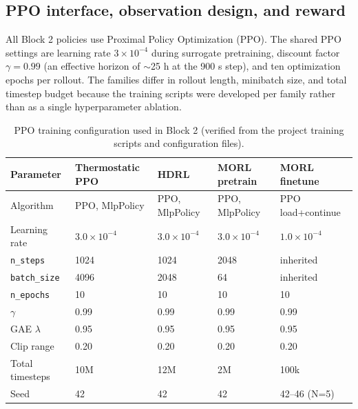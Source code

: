 \documentclass[11pt,a4paper]{article}
\begin{document}
\subsection{PPO interface, observation design, and reward}

All Block 2 policies use Proximal Policy Optimization (PPO). The shared PPO settings are learning rate $3\times 10^{-4}$ during surrogate pretraining, discount factor $\gamma=0.99$ (an effective horizon of $\sim$25 h at the 900 s step), and ten optimization epochs per rollout. The families differ in rollout length, minibatch size, and total timestep budget because the training scripts were developed per family rather than as a single hyperparameter ablation.

\begin{table}[H]
\centering
\caption{PPO training configuration used in Block 2 (verified from the project training scripts and configuration files).}
\label{tab:ppo_hparams}
\small
\begin{tabular}{lllll}
\toprule
Parameter & Thermostatic PPO & HDRL & MORL pretrain & MORL finetune \\
\midrule
Algorithm & PPO, MlpPolicy & PPO, MlpPolicy & PPO, MlpPolicy & PPO load+continue \\
Learning rate & $3.0{\times}10^{-4}$ & $3.0{\times}10^{-4}$ & $3.0{\times}10^{-4}$ & $1.0{\times}10^{-4}$ \\
\texttt{n\_steps} & 1024 & 1024 & 2048 & inherited \\
\texttt{batch\_size} & 4096 & 2048 & 64 & inherited \\
\texttt{n\_epochs} & 10 & 10 & 10 & 10 \\
$\gamma$ & 0.99 & 0.99 & 0.99 & 0.99 \\
GAE $\lambda$ & 0.95 & 0.95 & 0.95 & 0.95 \\
Clip range & 0.20 & 0.20 & 0.20 & 0.20 \\
Total timesteps & 10M & 12M & 2M & 100k \\
Seed & 42 & 42 & 42 & 42--46 (N=5) \\
\bottomrule
\end{tabular}
\end{table}
\end{document}
